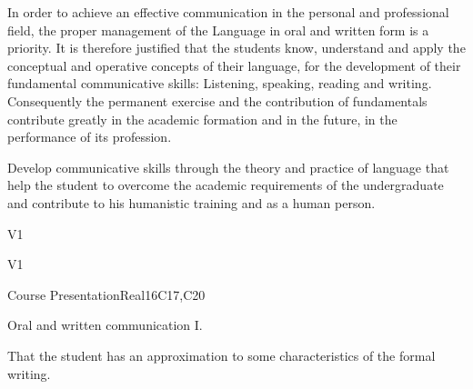 \begin{syllabus}


\begin{justification}
In order to achieve an effective communication in the personal and professional field, the proper management of the Language in oral and written form is a priority. It is therefore justified that the students know, understand and apply the conceptual and operative concepts of their language, for the development of their fundamental communicative skills: Listening, speaking, reading and writing.
Consequently the permanent exercise and the contribution of fundamentals contribute greatly in the academic formation and in the future, in the performance of its profession.
\end{justification}

\begin{goals}
\item Develop communicative skills through the theory and practice of language that help the student to overcome the academic requirements of the undergraduate and contribute to his humanistic training and as a human person.
\end{goals}

\begin{outcomes}{V1}
   \item {}
   \item {}
   \item {}
\end{outcomes}

\begin{competences}{V1}
    \item {}
    \item {}
    \item {}
\end{competences}

\begin{unit}{Course Presentation}{}{Real}{16}{C17,C20}
  \begin{topics}
      \item Oral and written communication I.
  \end{topics}

  \begin{learningoutcomes}
   \item That the student has an approximation to some characteristics of the formal writing.
  \end{learningoutcomes}
\end{unit}


\end{syllabus}
